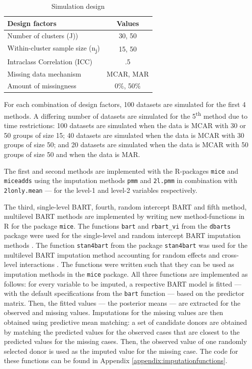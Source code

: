 \documentclass[10pt, a4paper, titlepage]{article}
\begin{document}
\begin{table}
\centering
\caption{Simulation design}
\label{tab:simulationparameters}
\begin{tabular}{l|c}
        \textbf{Design factors}                             & \textbf{Values} \\ \hline
        Number of clusters (J))                             & 30, 50 \\
        Within-cluster sample size (n\textsubscript{j})     & 15, 50 \\
        Intraclass Correlation (ICC)                        & .5 \\
        Missing data mechanism                              & MCAR, MAR \\
        Amount of missingness                               & 0\%, 50\%
\end{tabular}
\end{table} 
For each combination of design factors, 100 datasets are simulated for the first 4 methods. A differing number of datasets are simulated for the 5\textsuperscript{th} method due to time restrictions: 100 datasets are simulated when the data is MCAR with 30 or 50 groups of size 15; 40 datasets are simulated when the data is MCAR with 30 groups of size 50; and 20 datasets are simulated when the data is MCAR with 50 groups of size 50 and when the data is MAR.

The first and second methods are implemented with the R-packages \texttt{mice} and \texttt{miceadds} \citep{robitzsch2024} using the imputation methods \texttt{pmm} and \texttt{2l.pmm} in combination with \texttt{2lonly.mean} --- for the level-1 and level-2 variables respectively.

The third, single-level BART, fourth, random intercept BART and fifth method, multilevel BART methods are implemented by writing new method-functions in R for the package \texttt{mice}. The functions \texttt{bart} and \texttt{rbart\_vi} from the \texttt{dbarts} package were used for the single-level and random intercept BART imputation methods \citep{dorie2024}. The function \texttt{stan4bart} from the package \texttt{stan4bart} was used for the multilevel BART imputation method accounting for random effects and cross-level interactions \citep{dorie2023a}. The functions were written such that they can be used as imputation methods in the \texttt{mice} package. All three functions are implemented as follows: for every variable to be imputed, a respective BART model is fitted --- with the default specifications from the \texttt{bart} function --- based on the predictor matrix. Then, the fitted values --- the posterior means --- are extracted for the observed and missing values. Imputations for the missing values are then obtained using predictive mean matching: a set of candidate donors are obtained by matching the predicted values for the observed cases that are closest to the predicted values for the missing cases. Then, the observed value of one randomly selected donor is used as the imputed value for the missing case. The code for these functions can be found in Appendix \ref{appendix:imputationfunctions}.
\end{document}
